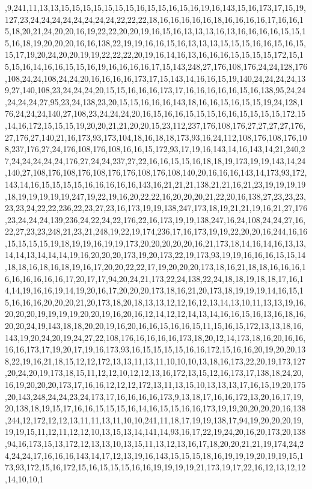 ,9,241,11,13,13,15,15,15,15,15,15,15,16,15,15,16,15,16,19,16,143,15,16,173,17,15,19,127,23,24,24,24,24,24,24,24,24,22,22,22,18,16,16,16,16,16,18,16,16,16,16,17,16,16,15,18,20,21,24,20,20,16,19,22,22,20,20,19,16,15,16,13,13,13,16,13,16,16,16,16,15,15,15,16,18,19,20,20,20,16,16,138,22,19,19,16,16,15,16,13,13,13,15,15,15,16,16,15,16,15,15,17,19,20,24,20,20,19,19,22,22,22,20,19,16,14,16,13,16,16,16,15,15,15,15,172,15,15,15,16,14,16,16,15,15,16,19,16,16,16,16,17,15,143,248,27,176,108,176,24,24,128,176,108,24,24,108,24,24,20,16,16,16,16,173,17,15,143,14,16,16,15,19,140,24,24,24,24,139,27,140,108,23,24,24,24,20,15,15,16,16,16,173,17,16,16,16,16,16,15,16,138,95,24,24,24,24,24,27,95,23,24,138,23,20,15,15,16,16,16,143,18,16,16,15,16,15,15,19,24,128,176,24,24,24,140,27,108,23,24,24,24,20,16,15,16,16,15,15,15,16,16,15,15,15,15,172,15,14,16,172,15,15,15,19,20,20,21,21,20,20,15,23,112,237,176,108,176,27,27,27,27,176,27,176,27,140,21,16,173,93,173,104,18,16,18,18,173,93,16,24,112,108,176,108,176,108,237,176,27,24,176,108,176,108,16,16,15,172,93,17,19,16,143,14,16,143,14,21,240,27,24,24,24,24,24,176,27,24,24,237,27,22,16,16,15,15,16,18,18,19,173,19,19,143,14,24,140,27,108,176,108,176,108,176,176,108,176,108,140,20,16,16,16,143,14,173,93,172,143,14,16,15,15,15,15,16,16,16,16,16,143,16,21,21,21,138,21,21,16,21,23,19,19,19,19,18,19,19,19,19,19,247,19,22,19,16,20,22,22,16,20,20,20,21,22,20,16,138,27,23,23,23,23,23,24,22,22,236,22,23,27,23,16,173,19,19,138,247,173,18,19,21,21,19,16,21,27,176,23,24,24,24,139,236,24,22,24,22,176,22,16,173,19,19,138,247,16,24,108,24,24,27,16,22,27,23,23,248,21,23,21,248,19,22,19,174,236,17,16,173,19,19,22,20,20,16,244,16,16,15,15,15,15,19,18,19,19,16,19,19,173,20,20,20,20,20,16,21,173,18,14,16,14,16,13,13,14,14,13,14,14,14,19,16,20,20,20,173,19,20,173,22,19,173,93,19,19,16,16,16,15,15,14,18,18,16,18,16,18,19,16,17,20,20,22,22,17,19,20,20,20,173,18,16,21,18,18,16,16,16,16,16,16,16,16,16,17,20,17,17,94,20,24,21,173,22,24,138,22,24,18,18,19,18,18,17,16,14,14,19,16,16,19,14,19,20,16,17,20,20,20,173,18,16,21,20,173,18,19,19,19,14,16,15,15,16,16,16,20,20,20,21,20,173,18,20,18,13,13,12,12,16,12,13,14,13,10,11,13,13,19,16,20,20,20,19,19,19,19,20,20,19,16,20,16,12,14,12,12,14,13,14,16,16,15,16,13,16,18,16,20,20,24,19,143,18,18,20,20,19,16,20,16,16,15,16,16,15,11,15,16,15,172,13,13,18,16,143,19,20,24,20,19,24,27,22,108,176,16,16,16,16,173,18,20,12,14,173,18,16,20,16,16,16,16,173,17,19,20,17,19,16,173,93,16,15,15,15,15,16,16,172,15,16,16,20,19,20,20,138,22,19,16,21,18,15,12,12,172,13,13,11,13,11,10,10,10,13,18,16,173,22,20,19,173,127,20,24,20,19,173,18,15,11,12,12,10,12,12,13,16,172,13,15,12,16,173,17,138,18,24,20,16,19,20,20,20,173,17,16,16,12,12,12,172,13,11,13,15,10,13,13,13,17,16,15,19,20,175,20,143,248,24,24,23,24,173,17,16,16,16,16,173,9,13,18,17,16,16,172,13,20,16,17,19,20,138,18,19,15,17,16,16,15,15,15,16,14,16,15,15,16,16,173,19,19,20,20,20,20,16,138,244,12,172,12,12,13,11,11,13,11,10,10,241,11,18,17,19,19,138,17,94,19,20,20,20,19,19,19,15,11,12,11,12,12,10,13,15,13,14,141,14,93,16,17,22,19,24,20,16,20,173,20,138,94,16,173,15,13,172,12,13,13,10,13,15,11,13,12,13,16,17,18,20,20,21,21,19,174,24,24,24,24,17,16,16,16,143,14,17,12,13,19,16,143,15,15,15,18,16,19,19,19,20,19,19,15,173,93,172,15,16,172,15,16,15,15,15,16,16,19,19,19,19,21,173,19,17,22,16,12,13,12,12,14,10,10,1
